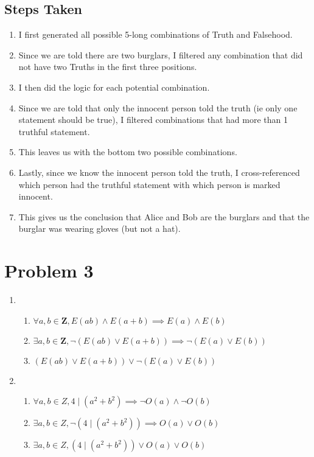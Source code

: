 \documentclass{article}
\begin{document}
\begin{landscape}
    \subsection*{Steps Taken}
    \begin{enumerate}[label=\arabic*.]
        \item I first generated all possible 5-long combinations of Truth and Falsehood.
        \item Since we are told there are two burglars, I filtered any combination that did not have two Truths in the first three positions.
        \item I then did the logic for each potential combination.
        \item Since we are told that only the innocent person told the truth (ie only one statement should be true), I filtered combinations that had more than 1 truthful statement.
        \item This leaves us with the bottom two possible combinations.
        \item Lastly, since we know the innocent person told the truth, I cross-referenced which person had the truthful statement with which person is marked innocent.
        \item This gives us the conclusion that Alice and Bob are the burglars and that the burglar was wearing gloves (but not a hat).
    \end{enumerate}
\end{landscape}

\pagebreak

\section*{Problem 3}
\begin{enumerate}[label=\arabic*)]
    \item \begin{enumerate}
        \item \(\forall a,b \in \mathbf{Z}, E(ab) \land E(a+b) \implies E(a) \land E(b)\)
        \item \(\exists a,b \in \mathbf{Z}, \neg (E(ab) \lor E(a+b)) \implies \neg (E(a) \lor E(b))\)
        \item \((E(ab) \lor E(a+b)) \lor \neg (E(a) \lor E(b))\)
    \end{enumerate}
    \item \begin{enumerate}
        \item \(\forall a,b \in Z, 4 \mid (a^2 + b^2) \implies \neg O(a) \land \neg O(b)\)
        \item \(\exists a,b \in Z, \neg(4 \mid (a^2 + b^2)) \implies O(a) \lor O(b)\)
        \item \(\exists a,b \in Z, (4 \mid (a^2 + b^2)) \lor O(a) \lor O(b)\)
    \end{enumerate}
\end{enumerate}
\end{document}

